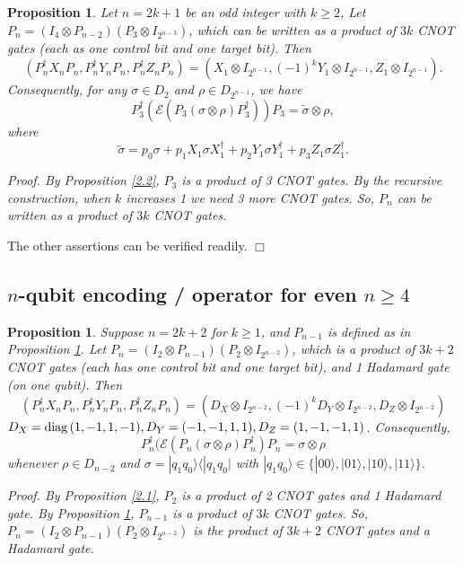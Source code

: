 \documentclass[11pt]{article}
\newtheorem{proposition}[theorem]{Proposition}
\def\qed{\hfill $\Box$\medskip}
\def\cE{{\mathcal E}}
\def\ra{{\rangle}}
\def\la{{\langle}}
\def\diag{{\rm diag}\,}
\begin{document}
 \begin{proposition} \label{2.3} Let $n = 2k+1$ be an odd integer with $k \ge 2$,
Let $P_{n} =(I_4 \otimes P_{n-2}) (P_3 \otimes I_{2^{n-3}})$,
which can be written as a product of $3k$ CNOT gates (each as one control bit and one
target bit).
Then 
$$(P_{n}^\dag X_{n}P_{n}, P_{n}^\dag Y_{n}P_{n}, 
P_{n}^\dag Z_{n}P_{n}) 
= 
 (X_1 \otimes I_{2^{n-1}}, (-1)^{k}Y_1 \otimes I_{2^{n-1}}, 
 Z_1 \otimes I_{2^{n-1}}).$$
Consequently, for any $\sigma \in D_2$ and $\rho \in D_{2^{n-1}}$, we have
$$P_3^\dag(\cE(P_3(\sigma\otimes \rho)P_3^\dag))P_3 = \tilde \sigma \otimes \rho,$$
where
$$\tilde \sigma 
= p_0 \sigma + p_1 X_1\sigma X_1^\dag + p_2 Y_1\sigma Y_1^\dag
+ p_3 Z_1 \sigma Z_1^\dag.$$
\end{proposition}

\it Proof. \rm  By Proposition \ref{2.2}, $P_3$ is a product of 3 CNOT gates. 
 By the recursive construction, when $k$ increases 1 we need 3 more CNOT gates.
 So, $P_n$ can be written as a product of $3k$ CNOT gates. 
 
 The other assertions can be verified readily. \qed
  
\subsection{$n$-qubit encoding / operator for even $n \ge 4$} 

\begin{proposition} \label{2.4}
Suppose $n = 2k+2$ for $k \ge 1$, and $P_{n-1}$ is defined as in Proposition \ref{2.3}.
Let $P_{n} =(I_2 \otimes P_{n-1}) (P_2 \otimes I_{2^{n-2}})$,
which is a product of $3k+2$ CNOT gates (each has one control bit and one target bit),
and 1 Hadamard gate (on one qubit).
Then 
$$(P_{n}^\dag X_{n}P_{n}, P_{n}^\dag Y_{n}P_{n}, 
P_{n}^\dag Z_{n}P_{n}) 
= 
 (D_X \otimes I_{2^{n-2}}, (-1)^kD_Y \otimes I_{2^{n-2}}, 
 D_Z \otimes I_{2^{n-2}})$$
$D_X = \diag(1,-1,1,-1), D_Y=(-1,-1,1,1), D_Z = (1, -1, -1, 1)$.
Consequently, 
$$P_n^\dag(\cE(P_n(\sigma\otimes \rho)P_n^\dag)P_n = \sigma\otimes \rho$$
whenever $\rho \in D_{n-2}$ and   $\sigma = |q_1q_0\ra \la |q_1q_0|$  with 
$|q_1q_0\ra \in \{|00\ra, |01\ra, |10\ra, |11\ra\}$. 
\end{proposition}

\it Proof. \rm By Proposition \ref{2.1}, $P_2$ is a product of 
2 CNOT gates and 1 Hadamard gate.  By Proposition \ref{2.3}, 
$P_{n-1}$ is a product of $3k$ CNOT gates.  So,  
$P_{n} =(I_2 \otimes P_{n-1}) (P_2 \otimes I_{2^{n-2}})$ is the product of 
$3k+2$ CNOT gates and a Hadamard gate.
\end{document}
